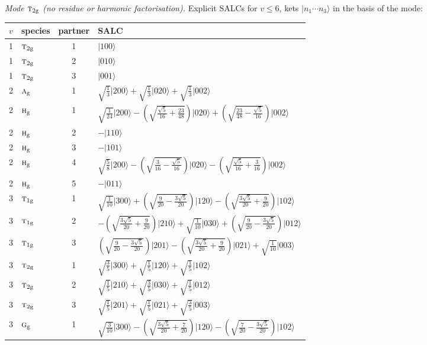 \documentclass[11pt]{article}
\newcommand{\irr}[1]{\text{\normalfont\scshape #1}}
\newcommand{\ptag}[1]{\mathrm{#1}}
\newcommand{\occ}[1]{\lvert #1\rangle}
\begin{document}
\emph{Mode $\irr{t}_{2\ptag{g}}$ (no residue or harmonic factorisation).} Explicit SALCs for $v\le6$, kets $\occ{n_1\cdots n_{3}}$ in the basis of the mode:
\begin{longtable}{c l c p{}}\hline $v$ & species & partner & SALC\\ \hline\endhead
1 & $\irr{t}_{2\ptag{g}}$ & 1 & $\occ{100}$\\
1 & $\irr{t}_{2\ptag{g}}$ & 2 & $\occ{010}$\\
1 & $\irr{t}_{2\ptag{g}}$ & 3 & $\occ{001}$\\
\hline
2 & $\irr{a}_{\ptag{g}}$ & 1 & $\sqrt{\tfrac{1}{3}}\occ{200}+\sqrt{\tfrac{1}{3}}\occ{020}+\sqrt{\tfrac{1}{3}}\occ{002}$\\
2 & $\irr{h}_{\ptag{g}}$ & 1 & $\sqrt{\tfrac{1}{24}}\occ{200}-(\sqrt{\frac{\sqrt{5}}{16} + \frac{23}{48}})\occ{020}+(\sqrt{\frac{23}{48} - \frac{\sqrt{5}}{16}})\occ{002}$\\
2 & $\irr{h}_{\ptag{g}}$ & 2 & $-\occ{110}$\\
2 & $\irr{h}_{\ptag{g}}$ & 3 & $-\occ{101}$\\
2 & $\irr{h}_{\ptag{g}}$ & 4 & $\sqrt{\tfrac{5}{8}}\occ{200}-(\sqrt{\frac{3}{16} - \frac{\sqrt{5}}{16}})\occ{020}-(\sqrt{\frac{\sqrt{5}}{16} + \frac{3}{16}})\occ{002}$\\
2 & $\irr{h}_{\ptag{g}}$ & 5 & $-\occ{011}$\\
\hline
3 & $\irr{t}_{1\ptag{g}}$ & 1 & $\sqrt{\tfrac{1}{10}}\occ{300}+(\sqrt{\frac{9}{20} - \frac{3 \sqrt{5}}{20}})\occ{120}-(\sqrt{\frac{3 \sqrt{5}}{20} + \frac{9}{20}})\occ{102}$\\
3 & $\irr{t}_{1\ptag{g}}$ & 2 & $-(\sqrt{\frac{3 \sqrt{5}}{20} + \frac{9}{20}})\occ{210}+\sqrt{\tfrac{1}{10}}\occ{030}+(\sqrt{\frac{9}{20} - \frac{3 \sqrt{5}}{20}})\occ{012}$\\
3 & $\irr{t}_{1\ptag{g}}$ & 3 & $(\sqrt{\frac{9}{20} - \frac{3 \sqrt{5}}{20}})\occ{201}-(\sqrt{\frac{3 \sqrt{5}}{20} + \frac{9}{20}})\occ{021}+\sqrt{\tfrac{1}{10}}\occ{003}$\\
3 & $\irr{t}_{2\ptag{g}}$ & 1 & $\sqrt{\tfrac{3}{5}}\occ{300}+\sqrt{\tfrac{1}{5}}\occ{120}+\sqrt{\tfrac{1}{5}}\occ{102}$\\
3 & $\irr{t}_{2\ptag{g}}$ & 2 & $\sqrt{\tfrac{1}{5}}\occ{210}+\sqrt{\tfrac{3}{5}}\occ{030}+\sqrt{\tfrac{1}{5}}\occ{012}$\\
3 & $\irr{t}_{2\ptag{g}}$ & 3 & $\sqrt{\tfrac{1}{5}}\occ{201}+\sqrt{\tfrac{1}{5}}\occ{021}+\sqrt{\tfrac{3}{5}}\occ{003}$\\
3 & $\irr{g}_{\ptag{g}}$ & 1 & $\sqrt{\tfrac{3}{10}}\occ{300}-(\sqrt{\frac{3 \sqrt{5}}{20} + \frac{7}{20}})\occ{120}-(\sqrt{\frac{7}{20} - \frac{3 \sqrt{5}}{20}})\occ{102}$\\

\end{longtable}
\end{document}
